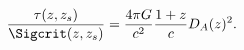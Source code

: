 \begin{equation}
\frac{\tau( z, z_s)}{\Sigcrit(z, z_s)} = \frac{4 \pi G}{c^2} \frac{1 + z}{c} D_A(z)^2.
\end{equation}